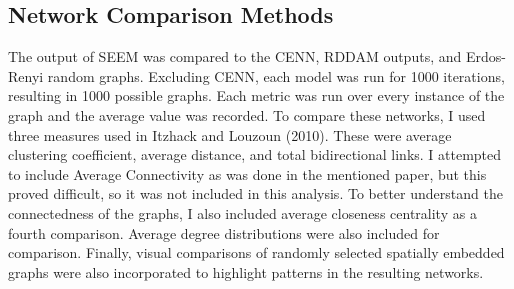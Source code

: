\subsection{Network Comparison Methods}
The output of SEEM was compared to the CENN, RDDAM outputs, and Erdos-Renyi random graphs. Excluding CENN, each model was run for 1000 iterations, resulting in 1000 possible graphs. Each metric was run over every instance of the graph and the average value was recorded. 
To compare these networks, I used three measures used in Itzhack and Louzoun (2010). These were average clustering coefficient, average distance, and total bidirectional links. I attempted to include Average Connectivity as was done in the mentioned paper, but this proved difficult, so it was not included in this analysis. To better understand the connectedness of the graphs, I also included average closeness centrality as a fourth comparison. Average degree distributions were also included for comparison. Finally, visual comparisons of randomly selected spatially embedded graphs were also incorporated to highlight patterns in the resulting networks.

